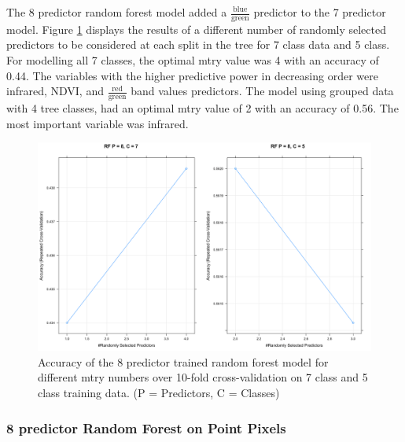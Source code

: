 \documentclass[12pt,twoside]{reedthesis}
\begin{document}
The 8 predictor random forest model added a \(\frac{\mbox{blue}}{\mbox{green}}\) predictor to the 7 predictor model. Figure \ref{fig:rf8} displays the results of a different number of randomly selected predictors to be considered at each split in the tree for 7 class data and 5 class. For modelling all 7 classes, the optimal mtry value was 4 with an accuracy of 0.44. The variables with the higher predictive power in decreasing order were infrared, NDVI, and \(\frac{\mbox{red}}{\mbox{green}}\) band values predictors. The model using grouped data with 4 tree classes, had an optimal mtry value of 2 with an accuracy of 0.56. The most important variable was infrared.
\begin{figure}

{\centering \includegraphics[width=0.9\linewidth]{figure/rf8_mtry} 

}

\caption{Accuracy of the 8 predictor trained random forest model for different mtry numbers over 10-fold cross-validation on 7 class and 5 class training data. (P = Predictors, C = Classes)}\label{fig:rf8}
\end{figure}
\hypertarget{predictor-random-forest-on-point-pixels}{%
\subsubsection{8 predictor Random Forest on Point Pixels}\label{predictor-random-forest-on-point-pixels}}
\end{document}
